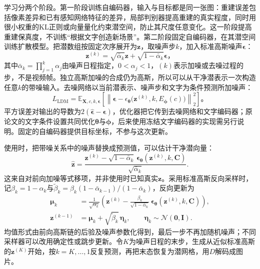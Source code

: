 学习分两个阶段。第一阶段训练自编码器，输入与目标都是同一张图：重建误差包括像素差异和已有感知网络特征的差异，局部判别器提高重建的真实程度，同时用很小权重的KL正则或向量量化约束潜空间，防止其尺度任意变化。这一阶段提高重建保真度，不训练“根据文字创造新场景”。第二阶段固定自编码器，在其潜空间训练扩散模型。把潜数组按固定次序展开为$\bm z$，取噪声步$k$，加入标准高斯噪声$\bm\epsilon$：
\[
  \bm z^{(k)}
  =\sqrt{\bar\alpha_k}\bm z+
    \sqrt{1-\bar\alpha_k}\bm\epsilon\text{，}
\]
其中$\bar\alpha_k=\prod_{j=1}^{k}\alpha_j$由噪声日程指定，$0<\alpha_j<1$，$(k)$表示加噪或去噪过程的步，不是视频帧。独立高斯加噪的合成仍为高斯，所以可以从干净潜表示一次构造任意$k$的带噪输入。去噪网络以当前潜表示、噪声步和文字为条件预测所加噪声：
\begin{equation}
  L_{\mathrm{LDM}}
  =\mathbb E_{\bm X,c,k,\bm\epsilon}
    \left[
      \left\lVert\bm\epsilon-
      \epsilon_{\bm\theta}
      \bigl(\bm z^{(k)},k,E_{\bm\phi}(c)\bigr)
      \right\rVert_2^2
    \right]\text{。}
  \label{eq:vision-ldm-objective}
\end{equation}
平方误差对输出的导数为$2(\widehat{\bm\epsilon}-\bm\epsilon)$，优化器把它传到去噪网络和文字编码器；原论文的文字条件设置共同优化$\bm\theta$与$\bm\phi$，后来使用冻结文字编码器的实现需另行说明。固定的自编码器提供目标坐标，不参与这次更新。

使用时，把带噪关系中的噪声替换成预测值，可以估计干净潜向量：
\begin{equation}
  \widehat{\bm z}
   =\frac{\bm z^{(k)}
       -\sqrt{1-\bar\alpha_k}\,
           \bm\epsilon_{\bm\theta}(\bm z^{(k)},k,\bm C)}
          {\sqrt{\bar\alpha_k}}.
  \label{eq:vision-ldm-clean-estimate}
\end{equation}
这来自对前向加噪等式移项，并非使用时已知真实$\bm z$。采用标准高斯反向采样时，记$\beta_k=1-\alpha_k$与$\widetilde\beta_k=\beta_k(1-\bar\alpha_{k-1})/(1-\bar\alpha_k)$，反向更新为
\begin{equation}
  \begin{aligned}
    \bm\mu_k
      &=\frac1{\sqrt{\alpha_k}}
        \left(\bm z^{(k)}
          -\frac{\beta_k}{\sqrt{1-\bar\alpha_k}}\,
             \bm\epsilon_{\bm\theta}(\bm z^{(k)},k,\bm C)\right),\\
    \bm z^{(k-1)}
      &=\bm\mu_k+\sqrt{\widetilde\beta_k}\,\bm\eta_k,
         \qquad \bm\eta_k\sim\mathcal N(\bm0,\bm I).
  \end{aligned}
  \label{eq:vision-ldm-reverse-interface}
\end{equation}
均值形式由前向高斯链的后验及噪声参数化得到，最后一步不再加随机噪声；不同采样器可以改用确定性或跳步更新。令$K$为噪声日程的末步，生成从近似标准高斯的$\bm z^{(K)}$开始，按$k=K,\ldots,1$反复预测，再把末态恢复为潜网格，用$D$解码成图片。

